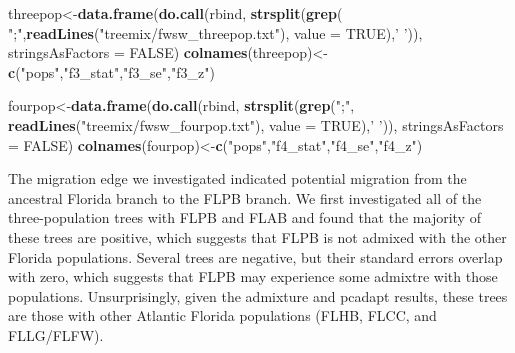 \documentclass[11pt,]{article}
\newenvironment{Shaded}{\begin{snugshade}}{\end{snugshade}}
\newcommand{\KeywordTok}[1]{\textcolor[rgb]{0.13,0.29,0.53}{\textbf{#1}}}
\newcommand{\DataTypeTok}[1]{\textcolor[rgb]{0.13,0.29,0.53}{#1}}
\newcommand{\StringTok}[1]{\textcolor[rgb]{0.31,0.60,0.02}{#1}}
\newcommand{\OtherTok}[1]{\textcolor[rgb]{0.56,0.35,0.01}{#1}}
\newcommand{\NormalTok}[1]{#1}
\begin{document}
\begin{Shaded}
\begin{Highlighting}[]
\NormalTok{threepop<-}\KeywordTok{data.frame}\NormalTok{(}\KeywordTok{do.call}\NormalTok{(rbind,}
                             \KeywordTok{strsplit}\NormalTok{(}\KeywordTok{grep}\NormalTok{(}
                               \StringTok{";"}\NormalTok{,}\KeywordTok{readLines}\NormalTok{(}\StringTok{"treemix/fwsw_threepop.txt"}\NormalTok{),}
                               \DataTypeTok{value =} \OtherTok{TRUE}\NormalTok{),}\StringTok{' '}\NormalTok{)),}
                     \DataTypeTok{stringsAsFactors =} \OtherTok{FALSE}\NormalTok{)}
\KeywordTok{colnames}\NormalTok{(threepop)<-}\KeywordTok{c}\NormalTok{(}\StringTok{"pops"}\NormalTok{,}\StringTok{"f3_stat"}\NormalTok{,}\StringTok{"f3_se"}\NormalTok{,}\StringTok{"f3_z"}\NormalTok{)}

\NormalTok{fourpop<-}\KeywordTok{data.frame}\NormalTok{(}\KeywordTok{do.call}\NormalTok{(rbind,}
                            \KeywordTok{strsplit}\NormalTok{(}\KeywordTok{grep}\NormalTok{(}\StringTok{";"}\NormalTok{,}
                                          \KeywordTok{readLines}\NormalTok{(}\StringTok{"treemix/fwsw_fourpop.txt"}\NormalTok{),}
                                          \DataTypeTok{value =} \OtherTok{TRUE}\NormalTok{),}\StringTok{' '}\NormalTok{)),}
                     \DataTypeTok{stringsAsFactors =} \OtherTok{FALSE}\NormalTok{)}
\KeywordTok{colnames}\NormalTok{(fourpop)<-}\KeywordTok{c}\NormalTok{(}\StringTok{"pops"}\NormalTok{,}\StringTok{"f4_stat"}\NormalTok{,}\StringTok{"f4_se"}\NormalTok{,}\StringTok{"f4_z"}\NormalTok{)}
\end{Highlighting}
\end{Shaded}

The migration edge we investigated indicated potential migration from
the ancestral Florida branch to the FLPB branch. We first investigated
all of the three-population trees with FLPB and FLAB and found that the
majority of these trees are positive, which suggests that FLPB is not
admixed with the other Florida populations. Several trees are negative,
but their standard errors overlap with zero, which suggests that FLPB
may experience some admixtre with those populations. Unsurprisingly,
given the admixture and pcadapt results, these trees are those with
other Atlantic Florida populations (FLHB, FLCC, and FLLG/FLFW).
\end{document}
